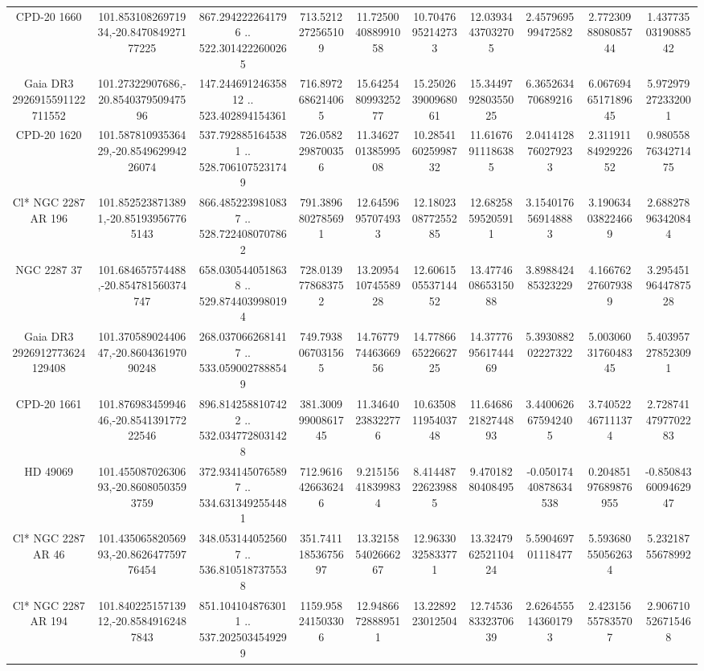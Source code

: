 \begin{table}
\begin{tabular}{cccccccccc}
CPD-20  1660 & 101.85310826971934,-20.847084927177225 & 867.2942222641796 .. 522.3014222600265 & 713.5212272565109 & 11.725004088991058 & 10.70476952142733 & 12.03934437032705 & 2.457969599472582 & 2.7723098808085744 & 1.4377350319088542 \\
Gaia DR3 2926915591122711552 & 101.27322907686,-20.854037950947596 & 147.24469124635812 .. 523.402894154361 & 716.8972686214065 & 15.642548099325277 & 15.250263900968061 & 15.344979280355025 & 6.365263470689216 & 6.0676946517189645 & 5.972979272332001 \\
CPD-20  1620 & 101.58781093536429,-20.854962994226074 & 537.7928851645381 .. 528.7061075231749 & 726.0582298700356 & 11.346270138599508 & 10.285416025998732 & 11.61676911186385 & 2.0414128760279233 & 2.3119118492922652 & 0.9805587634271475 \\
Cl* NGC 2287     AR     196 & 101.8525238713891,-20.851939567765143 & 866.4852239810837 .. 528.7224080707862 & 791.3896802785691 & 12.64596957074933 & 12.180230877255285 & 12.68258595205911 & 3.1540176569148883 & 3.190634038224669 & 2.688278963420844 \\
NGC  2287    37 & 101.684657574488,-20.854781560374747 & 658.0305440518638 .. 529.8744039980194 & 728.0139778683752 & 13.209541074558928 & 12.606150553714452 & 13.477460865315088 & 3.898842485323229 & 4.166762276079389 & 3.2954519644787528 \\
Gaia DR3 2926912773624129408 & 101.37058902440647,-20.860436197090248 & 268.0370662681417 .. 533.0590027888549 & 749.7938067031565 & 14.767797446366956 & 14.778666522662725 & 14.377769561744469 & 5.393088202227322 & 5.0030603176048345 & 5.403957278523091 \\
CPD-20  1661 & 101.87698345994646,-20.854139177222546 & 896.8142588107422 .. 532.0347728031428 & 381.30099900861745 & 11.34640238322776 & 10.635081195403748 & 11.646862182744893 & 3.4400626675942405 & 3.740522467111374 & 2.7287414797702283 \\
HD  49069 & 101.45508702630693,-20.86080503593759 & 372.9341450765897 .. 534.6313492554481 & 712.9616426636246 & 9.215156418399834 & 8.414487226239885 & 9.47018280408495 & -0.05017440878634538 & 0.20485197689876955 & -0.8508436009462947 \\
Cl* NGC 2287     AR      46 & 101.43506582056993,-20.862647759776454 & 348.0531440525607 .. 536.8105187375538 & 351.74111853675697 & 13.321585402666267 & 12.96330325833771 & 13.324796252110424 & 5.590469701118477 & 5.593680550562634 & 5.23218755678992 \\
Cl* NGC 2287     AR     194 & 101.84022515713912,-20.85849162487843 & 851.1041048763011 .. 537.2025034549299 & 1159.958241503306 & 12.94866728889511 & 13.2289223012504 & 12.745368332370639 & 2.6264555143601793 & 2.423156557835707 & 2.906710526715468 \\

\end{tabular}
\end{table}
